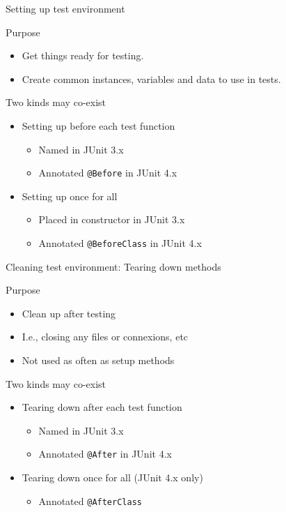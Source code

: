\begin{frame}{Setting up test environment}
  \begin{block}{Purpose}
    \begin{itemize}
    \item Get things ready for testing.
    \item Create common instances, variables and data to use in tests.
    \end{itemize}
  \end{block}

  \begin{block}{Two kinds may co-exist}
    \begin{itemize}
    \item Setting up before each test function
      \begin{itemize}
      \item Named  in JUnit 3.x
      \item Annotated \texttt{@Before} in JUnit 4.x
      \end{itemize}
    \item Setting up once for all 
      \begin{itemize}
      \item Placed in constructor in JUnit 3.x
      \item Annotated \texttt{@BeforeClass} in JUnit 4.x
      \end{itemize}
    \end{itemize}
  \end{block}
\end{frame}
\begin{frame}{Cleaning test environment: Tearing down methods}
  \begin{block}{Purpose}
    \begin{itemize}
    \item Clean up after testing
    \item I.e., closing any files or connexions, etc
    \item Not used as often as setup methods
    \end{itemize}
  \end{block}
  \begin{block}{Two kinds may co-exist}
    \begin{itemize}
    \item Tearing down after each test function
      \begin{itemize}
      \item Named  in JUnit 3.x
      \item Annotated \texttt{@After} in JUnit 4.x
      \end{itemize}
    \item Tearing down once for all (JUnit 4.x only)
      \begin{itemize}
      \item Annotated \texttt{@AfterClass}
      \end{itemize}
    \end{itemize}
  \end{block}
\end{frame}
